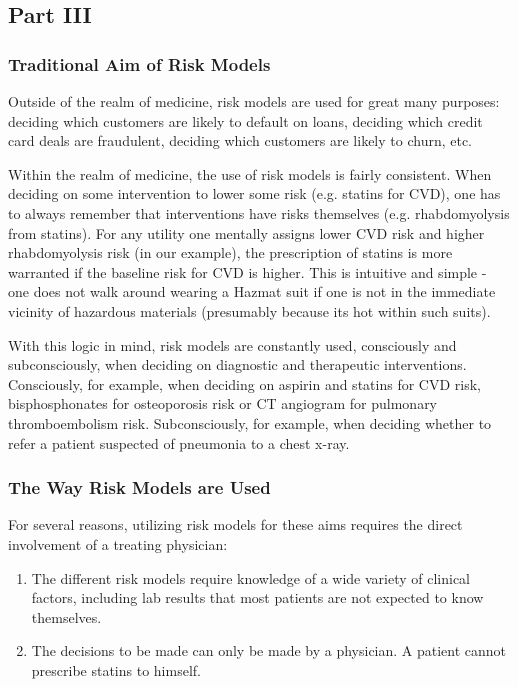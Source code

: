 \documentclass[a4paper,12pt]{article}
\begin{document}
		
		\subsection{Part III}
		
			\subsubsection{Traditional Aim of Risk Models}
			
			Outside of the realm of medicine, risk models are used for great many purposes: deciding which customers are likely to default on loans, deciding which credit card deals are fraudulent, deciding which customers are likely to churn, etc.
			
			Within the realm of medicine, the use of risk models is fairly consistent. When deciding on some intervention to lower some risk (e.g. statins for CVD), one has to always remember that interventions have risks themselves (e.g. rhabdomyolysis from statins). For any utility one mentally assigns lower CVD risk and higher rhabdomyolysis risk (in our example), the prescription of statins is more warranted if the baseline risk for CVD is higher. This is intuitive and simple - one does not walk around wearing a Hazmat suit if one is not in the immediate vicinity of hazardous materials (presumably because its hot within such suits).
			
			With this logic in mind, risk models are constantly used, consciously and subconsciously, when deciding on diagnostic and therapeutic interventions. Consciously, for example, when deciding on aspirin and statins for CVD risk\cite{Goff2014,Bibbins-Domingo2016}, bisphosphonates for osteoporosis risk \cite{Jeremiah2015} or CT angiogram for pulmonary thromboembolism risk\cite{Wells2001}. Subconsciously, for example, when deciding whether to refer a patient suspected of pneumonia to a chest x-ray.
			
			\subsubsection{The Way Risk Models are Used}
			
			For several reasons, utilizing risk models for these aims requires the direct involvement of a treating physician:
			\begin{enumerate}
				\item The different risk models require knowledge of a wide variety of clinical factors, including lab results that most patients are not expected to know themselves.
				\item The decisions to be made can only be made by a physician. A patient cannot prescribe statins to himself.
			\end{enumerate}
			
\end{document}
